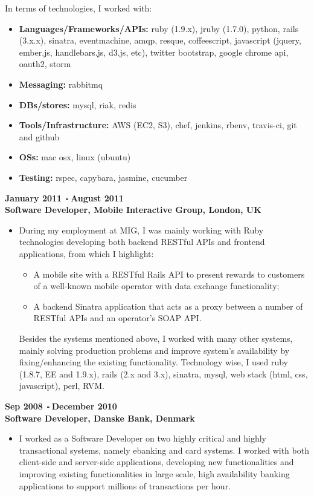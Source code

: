 \documentclass{res}
\def\Minus{\texttt{-}\,}
\begin{document}
\begin{resume}
\begin{itemize}
      In terms of technologies, I worked with:
      \begin{itemize}
        \item[] {\bf Languages/Frameworks/APIs:} ruby (1.9.x), jruby (1.7.0), python, rails (3.x.x), sinatra, eventmachine, amqp, resque, coffeescript, javascript (jquery, ember.js, handlebars.js, d3.js, etc), twitter bootstrap, google chrome api, oauth2, storm
        \item[] {\bf Messaging:} rabbitmq
        \item[] {\bf DBs/stores:} mysql, riak, redis
        \item[] {\bf Tools/Infrastructure:} AWS (EC2, S3), chef, jenkins, rbenv, travis-ci, git and github
        \item[] {\bf OSs:} mac osx, linux (ubuntu)
        \item[] {\bf Testing:} rspec, capybara, jasmine, cucumber
      \end{itemize}

      \end{itemize}
  {\bf January 2011 \Minus August 2011}\\
  {\bf Software Developer, Mobile Interactive Group, London, UK}
       \begin{itemize}
        \item[] During my employment at MIG, I was mainly working with Ruby technologies developing both backend RESTful APIs and frontend applications, from which I highlight:
          \begin{itemize}
          \item A mobile site with a RESTful Rails API to present rewards to customers of a well-known mobile operator with data exchange functionality;
          \item A backend Sinatra application that acts as a proxy between a number of RESTful APIs and an operator’s SOAP API.
          \end{itemize}

        Besides the systems mentioned above, I worked with many other systems, mainly solving production problems and improve system’s availability by fixing/enhancing the existing functionality. Technology wise, I used ruby (1.8.7, EE and 1.9.x), rails (2.x and 3.x), sinatra, mysql, web stack (html, css, javascript), perl, RVM.
    \end{itemize}

  {\bf Sep 2008 \Minus December 2010}\\
  {\bf Software Developer, Danske Bank, Denmark}
        \begin{itemize}
        \item[] I worked as a Software Developer on two highly critical and highly transactional systems, namely ebanking and card systems. I worked with both client-side and server-side applications, developing new functionalities and improving existing functionalities in large scale, high availability banking applications to support millions of transactions per hour.


\end{itemize}
\end{resume}
\end{document}
